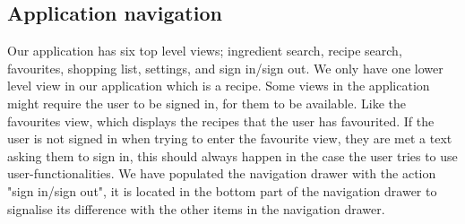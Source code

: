 \subsection{Application navigation}
Our application has six top level views; ingredient search, recipe search, favourites, shopping list, settings, and sign in/sign out. 
We only have one lower level view in our application which is a recipe. Some views in the application might require the user to be signed in, for them to be available. 
Like the favourites view, which displays the recipes that the user has favourited. 
If the user is not signed in when trying to enter the favourite view, they are met a text asking them to sign in, this should always happen in the case the user tries to use user-functionalities. 
We have populated the navigation drawer with the action "sign in/sign out", it is located in the bottom part of the navigation drawer to signalise its difference with the other items in the navigation drawer. 